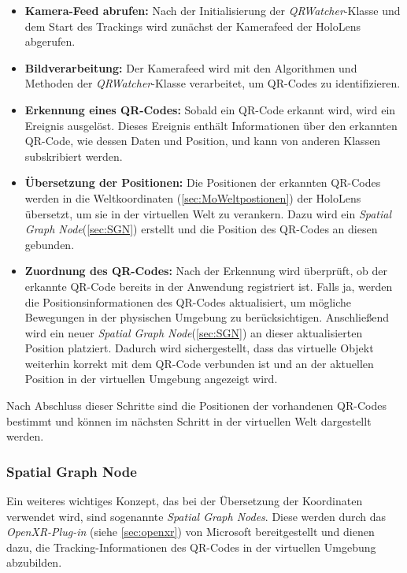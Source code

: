\begin{itemize}
    \item \textbf{Kamera-Feed abrufen:} Nach der Initialisierung der \textit{QRWatcher}-Klasse und dem Start des Trackings wird zunächst der Kamerafeed der HoloLens abgerufen.
    \item \textbf{Bildverarbeitung:} Der Kamerafeed wird mit den Algorithmen und Methoden der \textit{QRWatcher}-Klasse verarbeitet, um QR-Codes zu identifizieren.
    \item \textbf{Erkennung eines QR-Codes:} Sobald ein QR-Code erkannt wird, wird ein Ereignis ausgelöst. Dieses Ereignis enthält Informationen über den erkannten QR-Code, wie dessen Daten und Position, und kann von anderen Klassen subskribiert werden.
    \item \textbf{Übersetzung der Positionen:} Die Positionen der erkannten QR-Codes werden in die Weltkoordinaten (\ref{sec:MoWeltpostionen}) der HoloLens übersetzt, um sie in der virtuellen Welt zu verankern. Dazu wird ein \textit{Spatial Graph Node}(\ref{sec:SGN}) erstellt und die Position des QR-Codes an diesen gebunden.
    \item \textbf{Zuordnung des QR-Codes:} Nach der Erkennung wird überprüft, ob der erkannte QR-Code bereits in der Anwendung registriert ist. Falls ja, werden die Positionsinformationen des QR-Codes aktualisiert, um mögliche Bewegungen in der physischen Umgebung zu berücksichtigen. Anschließend wird ein neuer \textit{Spatial Graph Node}(\ref{sec:SGN}) an dieser aktualisierten Position platziert. Dadurch wird sichergestellt, dass das virtuelle Objekt weiterhin korrekt mit dem QR-Code verbunden ist und an der aktuellen Position in der virtuellen Umgebung angezeigt wird.
\end{itemize}

Nach Abschluss dieser Schritte sind die Positionen der vorhandenen QR-Codes bestimmt und können im nächsten Schritt in der virtuellen Welt dargestellt werden.

\subsubsection{\label{sec:SGN}Spatial Graph Node}
Ein weiteres wichtiges Konzept, das bei der Übersetzung der Koordinaten verwendet wird, sind sogenannte \textit{Spatial Graph Nodes}. Diese werden durch das \textit{OpenXR-Plug-in} (siehe \ref{sec:openxr}) von Microsoft bereitgestellt und dienen dazu, die Tracking-Informationen des QR-Codes in der virtuellen Umgebung abzubilden.

